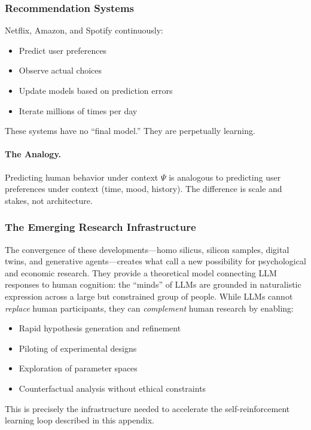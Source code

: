 \subsubsection{Recommendation Systems}

Netflix, Amazon, and Spotify continuously:
\begin{itemize}
    \item Predict user preferences
    \item Observe actual choices
    \item Update models based on prediction errors
    \item Iterate millions of times per day
\end{itemize}

These systems have no ``final model.'' They are perpetually learning.

\paragraph{The Analogy.}
Predicting human behavior under context $\Psi$ is analogous to predicting 
user preferences under context (time, mood, history). The difference is scale 
and stakes, not architecture.

\subsubsection{The Emerging Research Infrastructure}

The convergence of these developments---homo silicus, silicon samples, digital 
twins, and generative agents---creates what \citet{dillion2023} call a new 
possibility for psychological and economic research. They provide a theoretical 
model connecting LLM responses to human cognition: the ``minds'' of LLMs are 
grounded in naturalistic expression across a large but constrained group of 
people. While LLMs cannot \emph{replace} human participants, they can 
\emph{complement} human research by enabling:
\begin{itemize}
    \item Rapid hypothesis generation and refinement
    \item Piloting of experimental designs
    \item Exploration of parameter spaces
    \item Counterfactual analysis without ethical constraints
\end{itemize}

This is precisely the infrastructure needed to accelerate the self-reinforcement 
learning loop described in this appendix.

